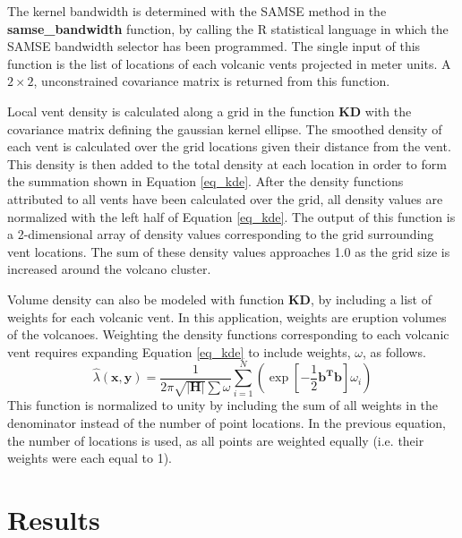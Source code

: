 \documentclass[12pt,letter]{article}
\begin{document}
The kernel bandwidth is determined with the SAMSE method in the \textbf{samse\_bandwidth} function, by calling the R statistical language in which the SAMSE bandwidth selector has been programmed. The single input of this function is the list of locations of each volcanic vents projected in meter units. A $2\times 2$, unconstrained covariance matrix is returned from this function.

Local vent density is calculated along a grid in the function \textbf{KD} with the covariance matrix defining the gaussian kernel ellipse. The smoothed density of each vent is calculated over the grid locations given their distance from the vent. This density is then added to the total density at each location in order to form the summation shown in Equation \ref{eq_kde}. After the density functions attributed to all vents have been calculated over the grid, all density values are normalized with the left half of Equation \ref{eq_kde}. The output of this function is a 2-dimensional array of density values corresponding to the grid surrounding vent locations. The sum of these density values approaches 1.0 as the grid size is increased around the volcano cluster.

Volume density can also be modeled with function \textbf{KD}, by including a list of weights for each volcanic vent. In this application, weights are eruption volumes of the volcanoes. Weighting the density functions corresponding to each volcanic vent requires expanding Equation \ref{eq_kde} to include weights, $\omega$, as follows.
\begin{equation}
\hat{\lambda}(\mathbf{x,y})=\frac{1}{2\pi\sqrt{|\mathbf{H}|}\sum{\omega}}\sum\limits_{i=1}^{N}\left(\exp\left[-\frac{1}{2}\mathbf{b^Tb}\right]\omega_i\right)
\label{eq_weigthedkde}
\end{equation}
This function is normalized to unity by including the sum of all weights in the denominator instead of the number of point locations. In the previous equation, the number of locations is used, as all points are weighted equally (i.e. their weights were each equal to 1).

\section{Results}
\end{document}

